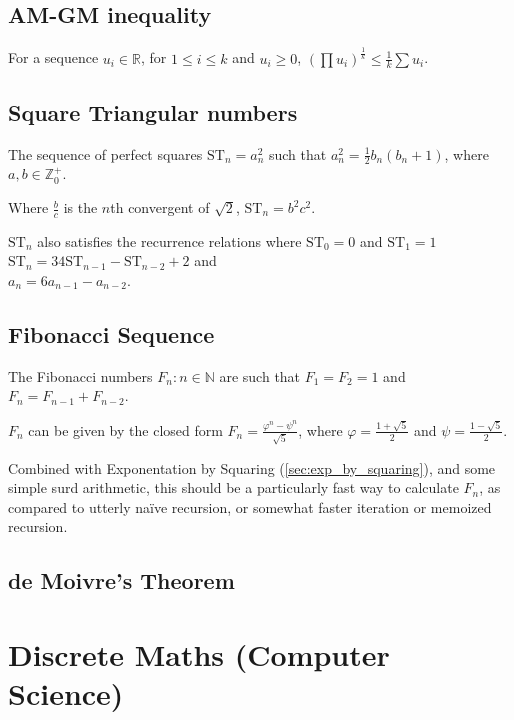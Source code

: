 \documentclass[a4paper,11pt]{article}
\begin{document}
    \subsection{AM-GM inequality}

    For a sequence $u_i \in \mathbb{R}$, for $1 \le i \le k$ and $u_i \ge 0$,
    $(\prod u_i)^\frac{1}{k} \le \frac{1}{k}\sum u_i$.

    \subsection{Square Triangular numbers}


    The sequence of perfect squares $\text{ST}_n = a_n^2$
    such that $a_n^2 = \frac 12 b_n(b_n + 1)$, where
    $a, b \in \mathbb{Z}_0^+$.

    Where $\frac{b}{c}$ is the $n$th convergent of $\sqrt 2$,
    $\text{ST}_n = b^2 c^2$.

    $\text{ST}_n$ also satisfies the recurrence relations where
    $\text{ST}_0 = 0$ and $\text{ST}_1 = 1$
    \\$\text{ST}_n = 34\text{ST}_{n - 1} - \text{ST}_{n - 2} + 2$ and
    \\$a_n = 6a_{n - 1} - a_{n - 2}$.

    \subsection{Fibonacci Sequence}

    The Fibonacci numbers $F_n: n \in \mathbb{N}$ are such that $F_1 = F_2 = 1$
    and $F_n = F_{n - 1} + F_{n - 2}$.

    $F_n$ can be given by the closed form
    $\displaystyle F_n = \frac{\varphi^n - \psi^n}{\sqrt 5}$, where
    $\displaystyle \varphi = \frac{1 + \sqrt 5} 2$ and
    $\displaystyle \psi = \frac{1 - \sqrt 5} 2$.

    Combined with Exponentation by Squaring (\ref{sec:exp_by_squaring}), and
    some simple surd arithmetic, this should be a particularly fast way to
    calculate $F_n$, as compared to utterly na\"ive recursion, or somewhat
    faster iteration or memoized recursion.

    \subsection{de Moivre's Theorem}

    \section{Discrete Maths (Computer Science)}
\end{document}
